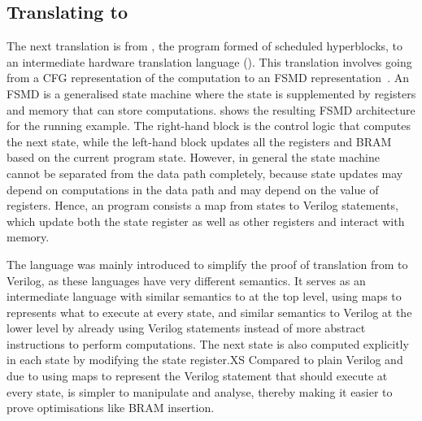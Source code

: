 
\subsection{Translating \rtlpar{} to \htl{}}

The next translation is from \rtlpar{}, the program formed of scheduled
hyperblocks, to an intermediate hardware translation language (\htl{}).  This
translation involves going from a \gls{CFG} representation of the computation to
an \gls{FSMD} representation~\cite{hwang99_ffplp}. An \gls{FSMD} is a
generalised state machine where the state is supplemented by registers and
memory that can store computations.   shows the
resulting \gls{FSMD} architecture for the running example. The right-hand block
is the control logic that computes the next state, while the left-hand block
updates all the registers and \gls{BRAM} based on the current program state.
However, in general the state machine cannot be separated from the data path
completely, because state updates may depend on computations in the data path
and may depend on the value of registers.  Hence, an \htl{} program consists a
map from states to Verilog statements, which update both the state register as
well as other registers and interact with memory.

The \htl{} language was mainly introduced to simplify the proof of translation
from \rtl{} to Verilog, as these languages have very different semantics.  It
serves as an intermediate language with similar semantics to \rtl{} at the top
level, using maps to represents what to execute at every state, and similar
semantics to Verilog at the lower level by already using Verilog statements
instead of more abstract instructions to perform computations.  The next state
is also computed explicitly in each state by modifying the state register.XS
Compared to plain Verilog and due to using maps to represent the Verilog
statement that should execute at every state, \htl{} is simpler to manipulate
and analyse, thereby making it easier to prove optimisations like \gls{BRAM}
insertion.

